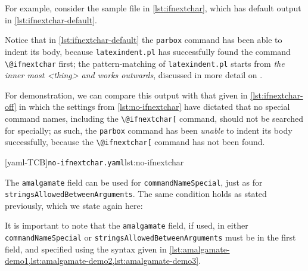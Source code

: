 \documentclass[10pt]{article}
\newcommand{\imagetouse}{logo-bw}
\begin{document}
 \begin{example}
 For example, consider the sample file in \cref{lst:ifnextchar}, which has default output
 in \cref{lst:ifnextchar-default}.

 \begin{cmhtcbraster}[raster column skip=.1\linewidth]
 \end{cmhtcbraster}

 Notice that in \cref{lst:ifnextchar-default} the \texttt{parbox} command has been able
 to indent its body, because \texttt{latexindent.pl} has successfully found the command
 \lstinline!\@ifnextchar! first; the pattern-matching of \texttt{latexindent.pl} starts
 from \emph{the inner most <thing> and works outwards}, discussed in more detail on
 .

 For demonstration, we can compare this output with that given in
 \cref{lst:ifnextchar-off} in which the settings from \cref{lst:no-ifnextchar} have
 dictated that no special command names, including the \lstinline!\@ifnextchar[! command,
 should not be searched for specially; as such, the \texttt{parbox} command has been
 \emph{unable} to indent its body successfully, because the \lstinline!\@ifnextchar[!
 command has not been found.

 \begin{cmhtcbraster}[raster column skip=.1\linewidth]
  [yaml-TCB]{\texttt{no-ifnextchar.yaml}}{lst:no-ifnextchar}
 \end{cmhtcbraster}
 \end{example}

 The \texttt{amalgamate} field can be used for \texttt{commandNameSpecial}, just as for
 \texttt{stringsAllowedBetweenArguments}. The same condition holds as stated previously,
 which we state again here: 

 \begin{warning}
  It is important to note that the \texttt{amalgamate} field, if used, in either
  \texttt{commandNameSpecial} or \texttt{stringsAllowedBetweenArguments} must be in the
  first field, and specified using the syntax given in
  \cref{lst:amalgamate-demo1,lst:amalgamate-demo2,lst:amalgamate-demo3}.
 \end{warning}
\renewcommand{\imagetouse}{logo}
\end{document}
